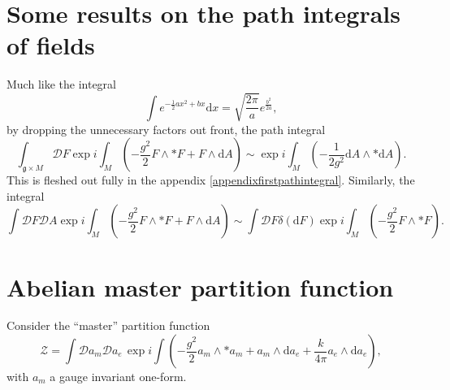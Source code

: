 \documentclass{article}
\begin{document}
\section{Some results on the path integrals of fields}
Much like the integral
\begin{equation}
    \int e^{-\frac{1}{2}ax^{2}+bx}\mathrm{d}x = \sqrt{\frac{2\pi}{a}}e^{\frac{b^{2}}{2a}},
\end{equation}
by dropping the unnecessary factors out front, the path integral 
\begin{equation}
    \boxed{
    \int_{\mathfrak{g}\times M}\mathcal{D}F\exp i \int_{M}\left(-\frac{g^{2}}{2}F\wedge * F + F\wedge \mathrm{d}A \right)\sim \exp i \int_{M}\left(-\frac{1}{2g^{2}}\mathrm{d}A\wedge *\mathrm{d}A\right).
    }
\end{equation}
This is fleshed out fully in the appendix \ref{appendixfirstpathintegral}. Similarly, the integral
\begin{equation}
    \boxed{
    \int \mathcal{D}F\mathcal{D}A\exp i \int_{M}\left(-\frac{g^{2}}{2}F\wedge * F + F\wedge \mathrm{d}A \right)\sim \int \mathcal{D}F\delta\left(\mathrm{d}F \right)\exp i \int_{M}\left(-\frac{g^{2}}{2}F\wedge * F \right).
    }
\end{equation}

\section{Abelian master partition function}
Consider the ``master'' partition function
\begin{equation}
    \mathcal{Z} = \int \mathcal{D}a_{m}\mathcal{D}a_{e}\,\exp i \int \left( -\frac{g^{2}}{2}a_{m}\wedge *a_{m} + a_{m}\wedge \mathrm{d}a_{e} + \frac{k}{4\pi}a_{e}\wedge \mathrm{d}a_{e} \right),
\end{equation}
with $a_{m}$ a gauge invariant one-form. 
\end{document}
